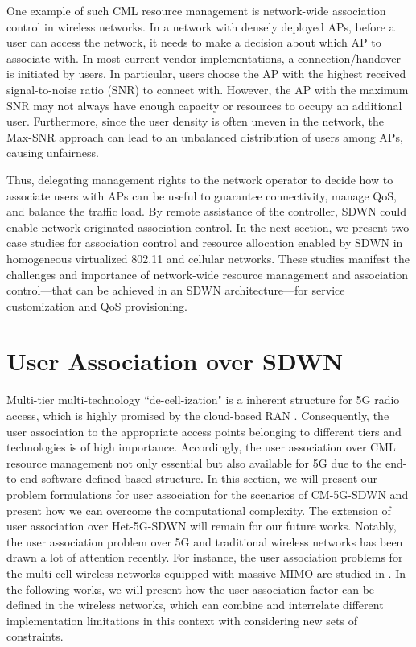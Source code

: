 \documentclass[conference]{IEEEtran}
\begin{document}
One example of such CML resource management is network-wide association control in wireless networks. In a network with densely deployed APs, before a user can access the network, it needs to make a decision about which AP to associate with. In most current vendor implementations, a connection/handover is initiated by users. In particular, users choose the AP with the highest received signal-to-noise ratio (SNR) to connect with. However, the AP with the maximum SNR may not always have enough capacity or resources to occupy an additional user. Furthermore, since the user density is often uneven in the network, the Max-SNR approach can lead to an unbalanced distribution of users among APs, causing unfairness.

Thus, delegating management rights to the network operator to decide how to associate users with APs can be useful to guarantee connectivity, manage QoS, and balance the traffic load. By remote assistance of the controller, SDWN could enable network-originated association control. In the next section, we present two case studies for association control and resource allocation enabled by SDWN in homogeneous virtualized 802.11 and cellular networks. These studies manifest the challenges and importance of network-wide resource management and association control---that can be achieved in an SDWN architecture---for service customization and QoS provisioning.

\section{User Association over SDWN}
Multi-tier multi-technology ``de-cell-ization" is a inherent structure for 5G radio access, which is highly promised by the cloud-based RAN \cite{6568922,7108393}. Consequently, the user association to the appropriate access points belonging to different tiers and technologies is of high importance. Accordingly, the user association over CML resource management not only essential but also available for 5G due to the end-to-end software defined based structure. In this section, we will present our problem formulations for user association for the scenarios of CM-5G-SDWN and present how we can overcome the computational complexity. The extension of user association over Het-5G-SDWN will remain for our future works. Notably, the user association problem over 5G and traditional wireless networks has been drawn a lot of attention recently. For instance, the user association problems for the multi-cell wireless networks equipped with massive-MIMO are studied in \cite{7247514,7153519,7166320,7314981}. In the following works, we will present how the user association factor can be defined in the wireless networks, which can combine and interrelate different implementation limitations in this context with considering new sets of constraints.
 
\end{document}
